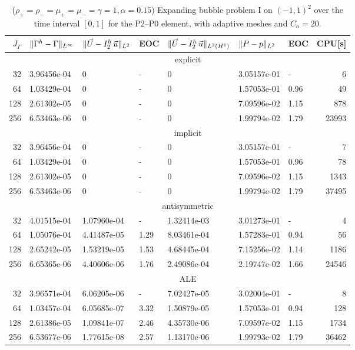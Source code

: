\begin{table}
\center
\hspace*{-3.25cm}
\begin{tabular}{rllllllr}
\hline
$J_\Gamma$ & $\|\Gamma^h - \Gamma\|_{L^\infty}$ & $\|\vec U - I^h_{2}\,\vec u\|_{L^2}$ & EOC & $\|\vec U - I^h_{2}\,\vec u\|_{L^2(H^1)}$ & $\|P - p\|_{L^2}$ & EOC
& CPU[s] \\
\hline
& \multicolumn{7}{c}{explicit} \\
\hline
 32 & 3.96456e-04 & 0 & - & 0 & 3.05157e-01 &    - &     6 \\
 64 & 1.03429e-04 & 0 & - & 0 & 1.57053e-01 & 0.96 &    49 \\
128 & 2.61302e-05 & 0 & - & 0 & 7.09596e-02 & 1.15 &   878 \\
256 & 6.53463e-06 & 0 & - & 0 & 1.99794e-02 & 1.79 & 23993 \\
\hline
& \multicolumn{7}{c}{implicit} \\
\hline
 32 & 3.96456e-04 & 0 & - & 0 & 3.05157e-01 &    - &     7 \\
 64 & 1.03429e-04 & 0 & - & 0 & 1.57053e-01 & 0.96 &    78 \\
128 & 2.61302e-05 & 0 & - & 0 & 7.09596e-02 & 1.15 &  1343 \\
256 & 6.53463e-06 & 0 & - & 0 & 1.99794e-02 & 1.79 & 37495 \\
\hline
& \multicolumn{7}{c}{antisymmetric} \\
\hline
 32 & 4.01515e-04 & 1.07960e-04 &    - & 1.32414e-03 & 3.01273e-01 &    - &
4 \\
 64 & 1.05076e-04 & 4.41487e-05 & 1.29 & 8.03461e-04 & 1.57283e-01 & 0.94 &
56 \\
128 & 2.65242e-05 & 1.53219e-05 & 1.53 & 4.68445e-04 & 7.15256e-02 & 1.14 &
1186 \\
256 & 6.65365e-06 & 4.40606e-06 & 1.76 & 2.49086e-04 & 2.19747e-02 & 1.66 &
24546 \\
\hline
& \multicolumn{7}{c}{ALE} \\
\hline
 32 & 3.96571e-04 & 6.06205e-06 &    - & 7.02427e-05 & 3.02004e-01 &    - &
8 \\
 64 & 1.03457e-04 & 6.05685e-07 & 3.32 & 1.50879e-05 & 1.57053e-01 & 0.94 &
128 \\
128 & 2.61386e-05 & 1.09841e-07 & 2.46 & 4.35730e-06 & 7.09597e-02 & 1.15 &
1734 \\
256 & 6.53677e-06 & 1.77615e-08 & 2.57 & 1.13170e-06 & 1.99793e-02 & 1.79 &
36462 \\
\hline
\end{tabular}
\hspace*{-3.25cm}
\caption[Navier--Stokes expanding bubble I errors P2--P0]
{($\rho_+ = \rho_- = \mu_+ = \mu_- = \gamma = 1,\alpha=0.15$)
Expanding bubble problem I on $(-1,1)^2$ over the time interval $[0,1]$ for the
P2--P0 element, with adaptive meshes and $C_a=20$\textdegree.}
\label{tab:nsexpandingbubbleIp2p0}
\end{table}

